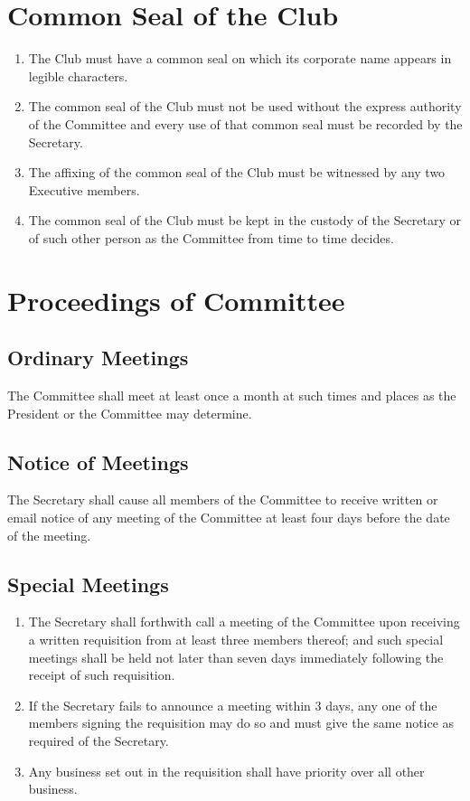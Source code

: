 \documentclass[11pt]{article} %
\begin{document}
\section{Common Seal of the Club}
\begin{enumerate}
\item The Club must have a common seal on which its corporate name appears in legible characters.
\item The common seal of the Club must not be used without the express authority of the Committee and every use of that common seal must be recorded by the Secretary.
\item The affixing of the common seal of the Club must be witnessed by any two Executive members.
\item The common seal of the Club must be kept in the custody of the Secretary or of such other person as the Committee from time to time decides.
\end{enumerate}

\section{Proceedings of Committee}
\subsection{Ordinary Meetings}
The Committee shall meet at least once a month at such times and places as the President or the Committee may determine.
\subsection{Notice of Meetings}
The Secretary shall cause all members of the Committee to receive written or email notice of any meeting of the Committee at least four days before the date of the meeting.
\subsection{Special Meetings}
\begin{enumerate}
	\item The Secretary shall forthwith call a meeting of the Committee upon receiving a written requisition from at least three members thereof; and such special meetings shall be held not later than seven days immediately following the receipt of such requisition.
	\item If the Secretary fails to announce a meeting within 3 days, any one of the members signing the requisition may do so and must give the same notice as required of the Secretary.
	\item Any business set out in the requisition shall have priority over all other business.
\end{enumerate}
\end{document}
